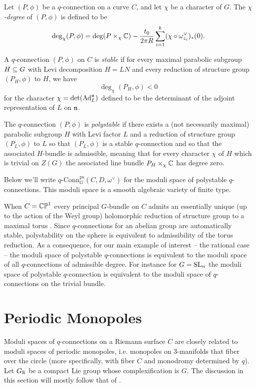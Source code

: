 \documentclass[10pt, oneside]{article}
\newcommand{\qconn}{q\text{-Conn}}
\begin{document}
\begin{definition}
Let $(P,\phi)$ be a $q$-connection on a curve $C$, and let $\chi$ be a character of $G$.  The \emph{$\chi$-degree} of $(P,\phi)$ is defined to be 
\[\deg_\chi(P,\phi) = \deg(P \times_\chi \mathbb{C}) - \frac {t_0}{2\pi R} \sum_{i=1}^k (\chi \circ \omega^\vee_{z_i})_*(0).\]

A $q$-connection $(P,\phi)$ on $C$ is \emph{stable} if for every maximal parabolic subgroup $H \subseteq G$ with Levi decomposition $H = LN$ and every reduction of structure group $(P_H, \phi)$ to $H$, we have
\[\deg_\chi(P_H, \phi) < 0\]
for the character $\chi = \det(\mathrm{Ad}_L^{\mathfrak{n}})$ defined to be the determinant of the adjoint representation of $L$ on $\mathfrak{n}$.

The $q$-connection $(P,\phi)$ is \emph{polystable} if there exists a (not necessarily maximal) parabolic subgroup $H$ with Levi factor $L$ and a reduction of structure group $(P_L, \phi)$ to $L$ so that $(P_L,\phi)$ is a stable $q$-connection and so that the associated $H$-bundle is admissible, meaning that for every character $\chi$ of $H$ which is trivial on $Z(G)$ the associated line bundle $P_H \times_\chi \mathbb{C}$ has degree zero. 
\end{definition}

Below we'll write $\qconn_G^{\text{ps}}(C, D, \omega^\vee)$ for the moduli space of polystable $q$-connections.  This moduli space is a smooth algebraic variety of finite type.  

When $C = \mathbb{CP}^1$ every principal $G$-bundle on $C$ admits an essentially unique (up to the action of the Weyl group) holomorphic reduction of structure group to a maximal torus \cite{GrothendieckSphere}.  Since $q$-connections for an abelian group are automatically stable, polystability on the sphere is equivalent to admissibility of the torus reduction.  As a consequence, for our main example of interest -- the rational case -- the moduli space of polystable $q$-connections is equivalent to the moduli space of all $q$-connections of admissible degree.  For instance for $G=\mathrm{SL}_n$ the moduli space of polystable $q$-connection is equivalent to the moduli space of $q$-connections on the trivial bundle.

\section{Periodic Monopoles}
Moduli spaces of $q$-connections on a Riemann surface $C$ are closely related to moduli spaces of periodic monopoles, i.e. monopoles on 3-manifolds that fiber over the circle (more specifically, with fiber $C$ and monodromy determined by $q$).  Let $G_{\mathbb{R}}$ be a compact Lie group whose complexification is $G$.  The discussion in this section will mostly follow that of \cite{CharbonneauHurtubise, Smith}.
\end{document}
